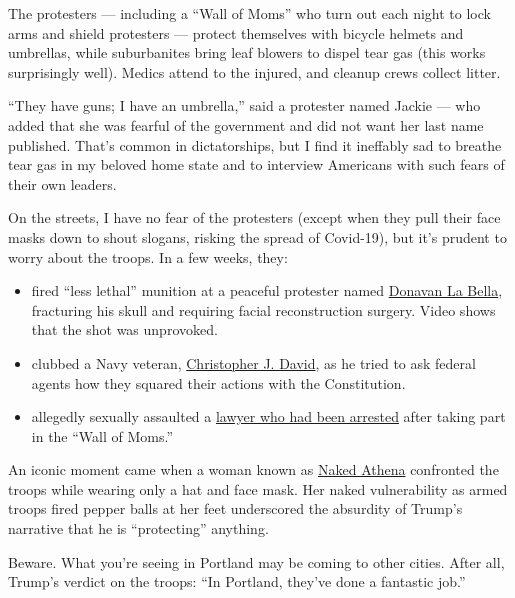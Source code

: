 The protesters --- including a ``Wall of Moms'' who turn out each night
to lock arms and shield protesters --- protect themselves with bicycle
helmets and umbrellas, while suburbanites bring leaf blowers to dispel
tear gas (this works surprisingly well). Medics attend to the injured,
and cleanup crews collect litter.

``They have guns; I have an umbrella,'' said a protester named Jackie
--- who added that she was fearful of the government and did not want
her last name published. That's common in dictatorships, but I find it
ineffably sad to breathe tear gas in my beloved home state and to
interview Americans with such fears of their own leaders.

On the streets, I have no fear of the protesters (except when they pull
their face masks down to shout slogans, risking the spread of Covid-19),
but it's prudent to worry about the troops. In a few weeks, they:

\begin{itemize}
\item
  fired ``less lethal'' munition at a peaceful protester named
  \href{https://www.oregonlive.com/portland/2020/07/donavan-la-bella-making-remarkable-recovery-from-head-injury-after-being-shot-by-feds-sister-says.html}{Donavan
  La Bella}, fracturing his skull and requiring facial reconstruction
  surgery. Video shows that the shot was unprovoked.
\item
  clubbed a Navy veteran,
  \href{https://www.nytimes.com/2020/07/20/us/portland-protests-navy-christopher-david.html}{Christopher
  J. David}, as he tried to ask federal agents how they squared their
  actions with the Constitution.
\item
  allegedly sexually assaulted a
  \href{https://heavy.com/news/2020/07/jennifer-kristiansen-portland-mom-arrested/?fbclid=IwAR2c1Q578gTltwDEb2Q_PoJzSQe8132kPnwpQzcrTBY9hO5jY_L5HQ6_TVk}{lawyer
  who had been arrested} after taking part in the ``Wall of Moms.''
\end{itemize}

An iconic moment came when a woman known as
\href{https://www.oregonlive.com/portland/2020/07/the-story-behind-the-surreal-photos-of-portland-protester-naked-athena.html}{Naked
Athena} confronted the troops while wearing only a hat and face mask.
Her naked vulnerability as armed troops fired pepper balls at her feet
underscored the absurdity of Trump's narrative that he is ``protecting''
anything.

Beware. What you're seeing in Portland may be coming to other cities.
After all, Trump's verdict on the troops: ``In Portland, they've done a
fantastic job.''

